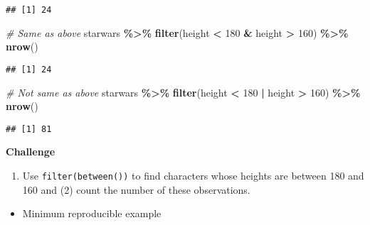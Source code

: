 \documentclass[
]{book}
\newenvironment{Shaded}{\begin{snugshade}}{\end{snugshade}}
\newcommand{\CommentTok}[1]{\textcolor[rgb]{0.56,0.35,0.01}{\textit{#1}}}
\newcommand{\DecValTok}[1]{\textcolor[rgb]{0.00,0.00,0.81}{#1}}
\newcommand{\KeywordTok}[1]{\textcolor[rgb]{0.13,0.29,0.53}{\textbf{#1}}}
\newcommand{\NormalTok}[1]{#1}
\newcommand{\OperatorTok}[1]{\textcolor[rgb]{0.81,0.36,0.00}{\textbf{#1}}}
\newcommand{\StringTok}[1]{\textcolor[rgb]{0.31,0.60,0.02}{#1}}
\providecommand{\tightlist}{%
  \setlength{\itemsep}{0pt}\setlength{\parskip}{0pt}}
\begin{document}
\begin{verbatim}
## [1] 24
\end{verbatim}

\begin{Shaded}
\begin{Highlighting}[]
\CommentTok{\# Same as above}
\NormalTok{starwars }\OperatorTok{\%\textgreater{}\%}
\StringTok{  }\KeywordTok{filter}\NormalTok{(height }\OperatorTok{\textless{}}\StringTok{ }\DecValTok{180} \OperatorTok{\&}\StringTok{ }\NormalTok{height }\OperatorTok{\textgreater{}}\StringTok{ }\DecValTok{160}\NormalTok{) }\OperatorTok{\%\textgreater{}\%}
\StringTok{  }\KeywordTok{nrow}\NormalTok{()}
\end{Highlighting}
\end{Shaded}

\begin{verbatim}
## [1] 24
\end{verbatim}

\begin{Shaded}
\begin{Highlighting}[]
\CommentTok{\# Not same as above}
\NormalTok{starwars }\OperatorTok{\%\textgreater{}\%}
\StringTok{  }\KeywordTok{filter}\NormalTok{(height }\OperatorTok{\textless{}}\StringTok{ }\DecValTok{180} \OperatorTok{|}\StringTok{ }\NormalTok{height }\OperatorTok{\textgreater{}}\StringTok{ }\DecValTok{160}\NormalTok{) }\OperatorTok{\%\textgreater{}\%}
\StringTok{  }\KeywordTok{nrow}\NormalTok{()}
\end{Highlighting}
\end{Shaded}

\begin{verbatim}
## [1] 81
\end{verbatim}

\textbf{Challenge}

\begin{enumerate}
\def\labelenumi{(\arabic{enumi})}
\tightlist
\item
  Use \texttt{filter(between())} to find characters whose heights are between 180 and 160 and (2) count the number of these observations.
\end{enumerate}

\begin{itemize}
\tightlist
\item
  Minimum reproducible example
\end{itemize}
\end{document}
